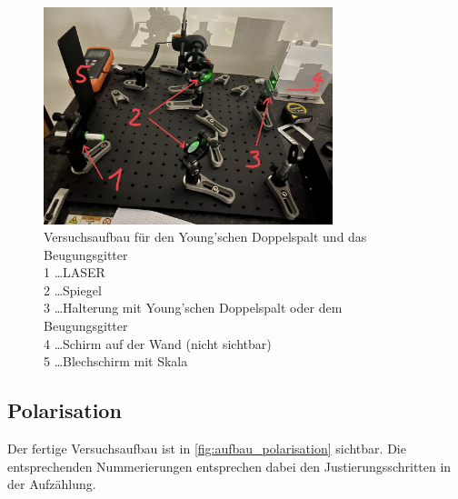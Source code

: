 \documentclass[12pt,english,ngerman]{scrartcl}
\begin{document}
\begin{figure}[H]
	\begin{center}
		\includegraphics[width =0.75\textwidth]{./figures/aufbau_doppelspalt.jpg}
	\end{center}
	\caption[Versuchsaufbau für den Young'schen Doppelspalt und das Beugungsgitter] {
		Versuchsaufbau für den Young'schen Doppelspalt und das Beugungsgitter \\
		1 \dots LASER                                                         \\
		2 \dots Spiegel                                                       \\
		3 \dots Halterung mit Young'schen Doppelspalt oder dem Beugungsgitter \\
		4 \dots Schirm auf der Wand (nicht sichtbar)                          \\
		5 \dots Blechschirm mit Skala
	}\label{fig:aufbau_doppelspalt}
\end{figure}

\newpage

\subsection{Polarisation}

Der fertige Versuchsaufbau ist in \autoref{fig:aufbau_polarisation} sichtbar.
Die entsprechenden Nummerierungen entsprechen dabei den Justierungsschritten in
der Aufzählung.
\end{document}
